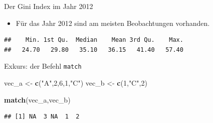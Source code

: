 \documentclass[ignorenonframetext,]{beamer}
\newenvironment{Shaded}{\begin{snugshade}}{\end{snugshade}}
\newcommand{\KeywordTok}[1]{\textcolor[rgb]{0.13,0.29,0.53}{\textbf{#1}}}
\newcommand{\DecValTok}[1]{\textcolor[rgb]{0.00,0.00,0.81}{#1}}
\newcommand{\StringTok}[1]{\textcolor[rgb]{0.31,0.60,0.02}{#1}}
\newcommand{\OperatorTok}[1]{\textcolor[rgb]{0.81,0.36,0.00}{\textbf{#1}}}
\newcommand{\NormalTok}[1]{#1}
\providecommand{\tightlist}{%
  \setlength{\itemsep}{0pt}\setlength{\parskip}{0pt}}
\begin{document}
\begin{frame}[fragile]{Der Gini Index im Jahr 2012}

\begin{itemize}
\tightlist
\item
  Für das Jahr 2012 sind am meisten Beobachtungen vorhanden.
\end{itemize}

\begin{Shaded}
\end{Shaded}

\begin{verbatim}
##    Min. 1st Qu.  Median    Mean 3rd Qu.    Max. 
##   24.70   29.80   35.10   36.15   41.40   57.40
\end{verbatim}

\end{frame}

\begin{frame}[fragile]{Exkurs: der Befehl \texttt{match}}

\begin{Shaded}
\begin{Highlighting}[]
\NormalTok{vec_a <-}\StringTok{ }\KeywordTok{c}\NormalTok{(}\StringTok{"A"}\NormalTok{,}\DecValTok{2}\NormalTok{,}\DecValTok{6}\NormalTok{,}\DecValTok{1}\NormalTok{,}\StringTok{"C"}\NormalTok{)}
\NormalTok{vec_b <-}\StringTok{ }\KeywordTok{c}\NormalTok{(}\DecValTok{1}\NormalTok{,}\StringTok{"C"}\NormalTok{,}\DecValTok{2}\NormalTok{)}

\KeywordTok{match}\NormalTok{(vec_a,vec_b)}
\end{Highlighting}
\end{Shaded}

\begin{verbatim}
## [1] NA  3 NA  1  2
\end{verbatim}

\end{frame}
\end{document}
